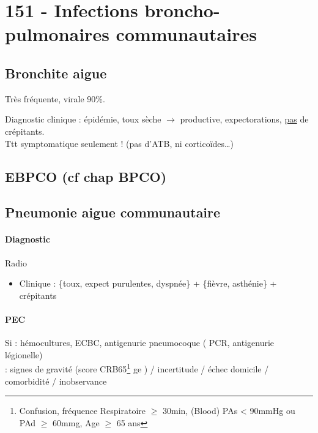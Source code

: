 \documentclass{book}
\begin{document}
\section{151 \textdagger{} - Infections broncho-pulmonaires communautaires}
\label{sec:org8438b09}
\subsection{Bronchite aigue}
\label{sec:orgc265eaa}
Très fréquente, virale 90\%. 

Diagnostic clinique : épidémie, toux sèche \(\to\) productive, expectorations,
\uline{pas} de crépitants.\\

Ttt symptomatique seulement ! (pas d'ATB, ni corticoïdes\ldots{})

\subsection{EBPCO (cf chap BPCO)}
\label{sec:org8909f89}

\subsection{Pneumonie aigue communautaire}
\label{sec:org96a1259}

\paragraph{Diagnostic}
\label{sec:org3cd15be}
Radio
\begin{itemize}
\item Clinique : \{toux, expect purulentes, dyspnée\} + \{fièvre, asthénie\} + crépitants
\end{itemize}

\paragraph{PEC}
\label{sec:orgec57425}
Si \faHospitalO : hémocultures, ECBC, antigenurie pneumocoque (\textpm{} PCR,
antigenurie légionelle)\\
\faHospitalO : signes de gravité (score CRB65\footnote{Confusion, fréquence Respiratoire \(\ge\) 30min, (Blood) PAs < 90mmHg ou PAd \(\ge\) 60mmg, Age \(\ge\) 65 ans} ge  ) / incertitude / échec domicile / comorbidité / inobservance
\end{document}
